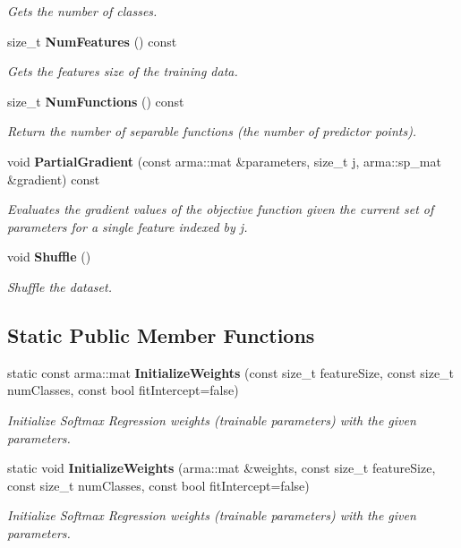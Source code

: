 \begin{DoxyCompactItemize}
\begin{DoxyCompactList}\small\item\em Gets the number of classes. \end{DoxyCompactList}\item 
size\+\_\+t \textbf{ Num\+Features} () const
\begin{DoxyCompactList}\small\item\em Gets the features size of the training data. \end{DoxyCompactList}\item 
size\+\_\+t \textbf{ Num\+Functions} () const
\begin{DoxyCompactList}\small\item\em Return the number of separable functions (the number of predictor points). \end{DoxyCompactList}\item 
void \textbf{ Partial\+Gradient} (const arma\+::mat \&parameters, size\+\_\+t j, arma\+::sp\+\_\+mat \&gradient) const
\begin{DoxyCompactList}\small\item\em Evaluates the gradient values of the objective function given the current set of parameters for a single feature indexed by j. \end{DoxyCompactList}\item 
void \textbf{ Shuffle} ()
\begin{DoxyCompactList}\small\item\em Shuffle the dataset. \end{DoxyCompactList}\end{DoxyCompactItemize}
\subsection*{Static Public Member Functions}
\begin{DoxyCompactItemize}
\item 
static const arma\+::mat \textbf{ Initialize\+Weights} (const size\+\_\+t feature\+Size, const size\+\_\+t num\+Classes, const bool fit\+Intercept=false)
\begin{DoxyCompactList}\small\item\em Initialize Softmax Regression weights (trainable parameters) with the given parameters. \end{DoxyCompactList}\item 
static void \textbf{ Initialize\+Weights} (arma\+::mat \&weights, const size\+\_\+t feature\+Size, const size\+\_\+t num\+Classes, const bool fit\+Intercept=false)
\begin{DoxyCompactList}\small\item\em Initialize Softmax Regression weights (trainable parameters) with the given parameters. \end{DoxyCompactList}\end{DoxyCompactItemize}


